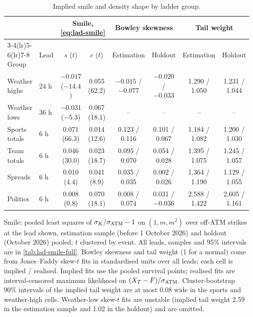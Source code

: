 \begin{table}[t]
\centering\footnotesize
\setlength{\tabcolsep}{2.8pt}
\begin{threeparttable}
\caption{Implied smile and density shape by ladder group.}\label{tab:lad-smile}
\begin{tabular}{@{}llcccccc@{}}
\toprule
 & & \multicolumn{2}{c}{Smile, \eqref{eq:lad-smile}} & \multicolumn{2}{c}{Bowley skewness} & \multicolumn{2}{c}{Tail weight} \\
\cmidrule(lr){3-4}\cmidrule(lr){5-6}\cmidrule(lr){7-8}
Group & Lead & $s$ ($t$) & $c$ ($t$) & Estimation & Holdout & Estimation & Holdout \\
\midrule
Weather highs & 24 h & $-0.017$ ($-14.4$) & 0.055 (62.2) & $-0.015$ / $-0.077$ & $-0.020$ / $-0.033$ & 1.290 / 1.050 & 1.231 / 1.044 \\
Weather lows  & 36 h & $-0.031$ ($-5.3$) & 0.067 (18.1) & -- & -- & -- & -- \\
Sports totals & 6 h  & 0.071 (66.3) & 0.014 (12.6) & 0.123 / 0.116 & 0.101 / 0.067 & 1.184 / 1.082 & 1.200 / 1.030 \\
Team totals   & 6 h  & 0.046 (30.0) & 0.023 (18.7) & 0.095 / 0.070 & 0.054 / 0.028 & 1.395 / 1.075 & 1.245 / 1.057 \\
Spreads       & 6 h  & 0.010 (4.4) & 0.041 (8.9) & 0.035 / 0.035 & 0.002 / 0.026 & 1.364 / 1.190 & 1.129 / 1.055 \\
Politics      & 6 h  & 0.008 (0.8) & 0.070 (18.1) & 0.008 / 0.074 & 0.031 / $-0.036$ & 2.588 / 1.422 & 2.605 / 1.161 \\
\bottomrule
\end{tabular}
\begin{tablenotes}[flushleft]\footnotesize
\item Smile: pooled least squares of $\sigma_K/\sigma_{\mathrm{ATM}}-1$ on $(1,m,m^2)$ over off-ATM strikes at the
lead shown, estimation sample (before 1 October 2026) and holdout (October 2026) pooled; $t$
clustered by event. All leads, samples and 95\% intervals are in \cref{tab:lad-smile-full}.
Bowley skewness and tail weight (1 for a normal) come from Jones--Faddy skew-$t$ fits in
standardised units over all leads; each cell is implied / realised. Implied fits use the pooled
survival points; realised fits are interval-censored maximum likelihood on $(X_T-F)/\sigma_{\mathrm{ATM}}$.
Cluster-bootstrap 90\% intervals of the implied tail weight are at most 0.08 wide in the
sports and weather-high cells. Weather-low skew-$t$ fits are unstable (implied tail weight 2.59
in the estimation sample and 1.02 in the holdout) and are omitted.
\end{tablenotes}
\end{threeparttable}
\end{table}

